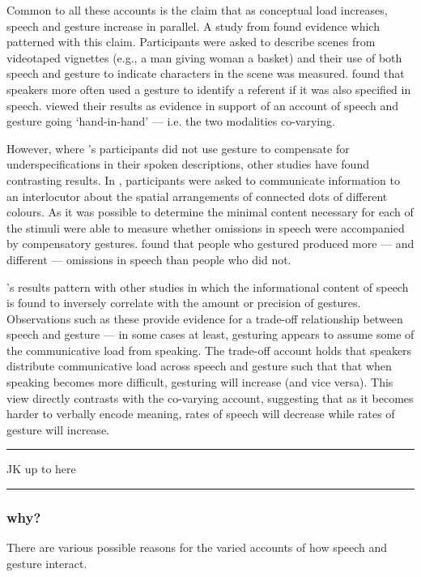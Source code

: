 \documentclass[a4paper,man,natbib]{apa6}
\begin{document}
Common to all these accounts is the claim that as conceptual load increases, speech and gesture increase in parallel.
A \citeyear{So2009} study from \citeauthor{So2009} found evidence which patterned with this claim. 
Participants were asked to describe scenes from videotaped vignettes (e.g., a man giving woman a basket) and their use of both speech and gesture to indicate characters in the scene was measured.
\citeauthor{So2009} found that speakers more often used a gesture to identify a referent if it was also specified in speech. 
\citeauthor{So2009} viewed their results as evidence in support of an account of speech and gesture going `hand-in-hand' --- i.e. the two modalities co-varying.

However, where \citeauthor{So2009}'s participants did not use gesture to compensate for underspecifications in their spoken descriptions, other studies have found contrasting results.
In \citet{Melinger2004}, participants were asked to communicate information to an interlocutor about the spatial arrangements of connected dots of different colours. 
As it was possible to determine the minimal content necessary for each of the stimuli \citeauthor{Melinger2004} were able to measure whether omissions in speech were accompanied by compensatory gestures. 
\citeauthor{Melinger2004} found that people who gestured produced more --- and different --- omissions in speech than people who did not. 

\citeauthor{Melinger2004}'s results pattern with other studies \citep{Bangerter2004, DeRuiter2006, VanderSluis2007} in which the informational content of speech is found to inversely correlate with the amount or precision of gestures. 
Observations such as these provide evidence for a trade-off relationship between speech and gesture --- in some cases at least, gesturing appears to assume some of the communicative load from speaking.
The trade-off account holds that speakers distribute communicative load across speech and gesture such that that when speaking becomes more difficult, gesturing will increase (and vice versa). 
This view directly contrasts with the co-varying account, suggesting that as it becomes harder to verbally encode meaning, rates of speech will decrease while rates of gesture will increase. 



\hrule
\vspace{5em}
JK up to here
\vspace{5em}
\hrule


\subsubsection{why?}
There are various possible reasons for the varied accounts of how speech and gesture interact. 
\end{document}

